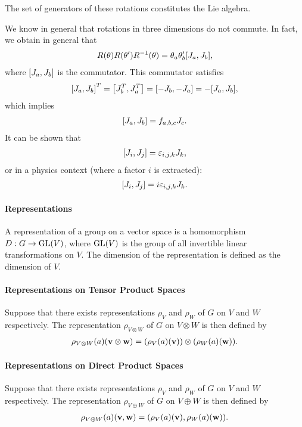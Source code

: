 The set of generators of these rotations constitutes the Lie algebra.

We know in general that rotations in three dimensions do not commute. In fact, we obtain in general that
\begin{align*}
	R(\vb{\theta})R(\vb{\theta}')R^{-1}(\vb{\theta}) = \theta_{a}\theta_{b}'\comm{J_{a}}{J_{b}},
\end{align*}
where $\comm{J_{a}}{J_{b}}$ is the commutator. This commutator satisfies
\begin{align*}
	\comm{J_{a}}{J_{b}}^{T} = \comm{J_{b}^{T}}{J_{a}^{T}} = \comm{-J_{b}}{-J_{a}} = -\comm{J_{a}}{J_{b}},
\end{align*}
which implies
\begin{align*}
	\comm{J_{a}}{J_{b}} = f_{a,b,c}J_{c}.
\end{align*}
It can be shown that
\begin{align*}
	\comm{J_{i}}{J_{j}} = \varepsilon_{i,j,k}J_{k},
\end{align*}
or in a physics context (where a factor $i$ is extracted):
\begin{align*}
	\comm{J_{i}}{J_{j}} = i\varepsilon_{i,j,k}J_{k}.
\end{align*}

\paragraph{Representations}
A representation of a group on a vector space is a homomorphism $D: G\to\text{GL}(V)$, where $\text{GL}(V)$ is the group of all invertible linear transformations on $V$. The dimension of the representation is defined as the dimension of $V$.

\paragraph{Representations on Tensor Product Spaces}
Suppose that there exists representations $\rho_{V}$ and $\rho_{W}$ of $G$ on $V$ and $W$ respectively. The representation $\rho_{V\otimes W}$ of $G$ on $V\otimes W$ is then defined by
\begin{align*}
	\rho_{V\otimes W}(a)(\vb{v}\otimes\vb{w}) = (\rho_{V}(a)(\vb{v}))\otimes(\rho_{W}(a)(\vb{w})).
\end{align*}

\paragraph{Representations on Direct Product Spaces}
Suppose that there exists representations $\rho_{V}$ and $\rho_{W}$ of $G$ on $V$ and $W$ respectively. The representation $\rho_{V\oplus W}$ of $G$ on $V\oplus W$ is then defined by
\begin{align*}
	\rho_{V\oplus W}(a)(\vb{v}, \vb{w}) = (\rho_{V}(a)(\vb{v}), \rho_{W}(a)(\vb{w})).
\end{align*}


